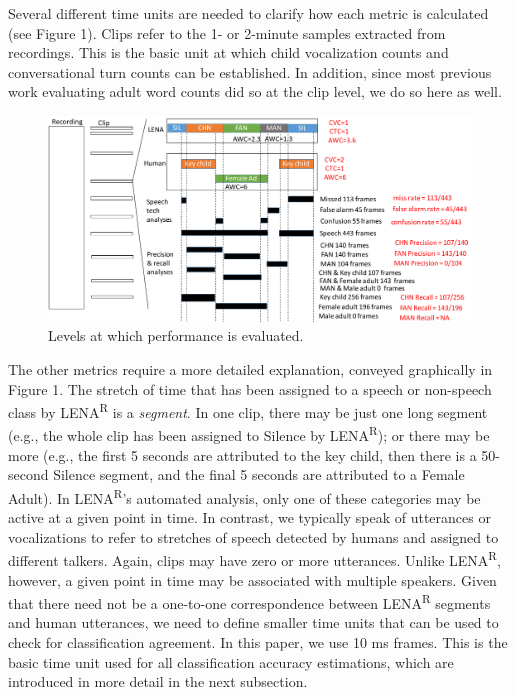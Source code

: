 \documentclass[english,table,man,floatsintext]{apa6}
\begin{document}
Several different time units are needed to clarify how each metric is calculated (see Figure 1). Clips refer to the 1- or 2-minute samples extracted from recordings. This is the basic unit at which child vocalization counts and conversational turn counts can be established. In addition, since most previous work evaluating adult word counts did so at the clip level, we do so here as well.

\begin{figure}
\centering
\includegraphics{fig_levels.pdf}
\caption{Levels at which performance is evaluated.}
\end{figure}

The other metrics require a more detailed explanation, conveyed graphically in Figure 1. The stretch of time that has been assigned to a speech or non-speech class by LENA\textsuperscript{R} is a \emph{segment}. In one clip, there may be just one long segment (e.g., the whole clip has been assigned to Silence by LENA\textsuperscript{R}); or there may be more (e.g., the first 5 seconds are attributed to the key child, then there is a 50-second Silence segment, and the final 5 seconds are attributed to a Female Adult). In LENA\textsuperscript{R}'s automated analysis, only one of these categories may be active at a given point in time. In contrast, we typically speak of utterances or vocalizations to refer to stretches of speech detected by humans and assigned to different talkers. Again, clips may have zero or more utterances. Unlike LENA\textsuperscript{R}, however, a given point in time may be associated with multiple speakers.
Given that there need not be a one-to-one correspondence between LENA\textsuperscript{R} segments and human utterances, we need to define smaller time units that can be used to check for classification agreement. In this paper, we use 10 ms frames. This is the basic time unit used for all classification accuracy estimations, which are introduced in more detail in the next subsection.
\end{document}
